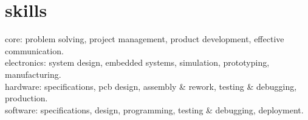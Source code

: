 
\section{skills}
  \vspace{-0.2cm}

{\headingfont core}: problem solving, project management, product development, effective communication.\\
{\headingfont electronics}: system design, embedded systems, simulation, prototyping, manufacturing.\\
{\headingfont hardware}: specifications, pcb design, assembly \& rework, testing \& debugging, production. \\
{\headingfont software}: specifications, design, programming, testing \& debugging, deployment.